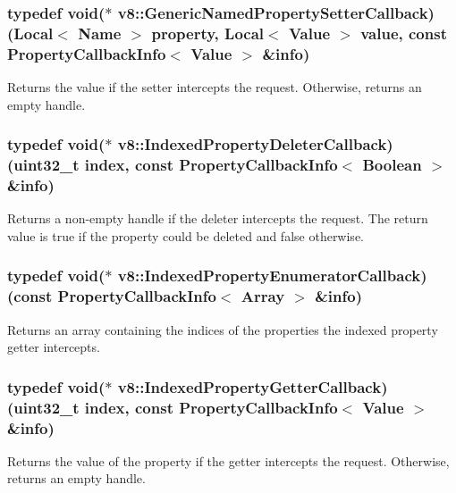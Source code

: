 \subsubsection[{Generic\+Named\+Property\+Setter\+Callback}]{\setlength{\rightskip}{0pt plus 5cm}typedef void($\ast$ v8\+::\+Generic\+Named\+Property\+Setter\+Callback) ({\bf Local}$<$ {\bf Name} $>$ property, {\bf Local}$<$ {\bf Value} $>$ value, const {\bf Property\+Callback\+Info}$<$ {\bf Value} $>$ \&info)}\label{namespacev8_af74716c6e95a269c6cd4314662fd0a7e}
Returns the value if the setter intercepts the request. Otherwise, returns an empty handle. \hypertarget{namespacev8_a53863728de14cde48dd6543207b2f2da}{}
\subsubsection[{Indexed\+Property\+Deleter\+Callback}]{\setlength{\rightskip}{0pt plus 5cm}typedef void($\ast$ v8\+::\+Indexed\+Property\+Deleter\+Callback) (uint32\+\_\+t index, const {\bf Property\+Callback\+Info}$<$ {\bf Boolean} $>$ \&info)}\label{namespacev8_a53863728de14cde48dd6543207b2f2da}
Returns a non-\/empty handle if the deleter intercepts the request. The return value is true if the property could be deleted and false otherwise. \hypertarget{namespacev8_adbb0a6d5537371953f9ba807d4f6275e}{}
\subsubsection[{Indexed\+Property\+Enumerator\+Callback}]{\setlength{\rightskip}{0pt plus 5cm}typedef void($\ast$ v8\+::\+Indexed\+Property\+Enumerator\+Callback) (const {\bf Property\+Callback\+Info}$<$ {\bf Array} $>$ \&info)}\label{namespacev8_adbb0a6d5537371953f9ba807d4f6275e}
Returns an array containing the indices of the properties the indexed property getter intercepts. \hypertarget{namespacev8_a48e7816ba64447bf32a25d194588daaf}{}
\subsubsection[{Indexed\+Property\+Getter\+Callback}]{\setlength{\rightskip}{0pt plus 5cm}typedef void($\ast$ v8\+::\+Indexed\+Property\+Getter\+Callback) (uint32\+\_\+t index, const {\bf Property\+Callback\+Info}$<$ {\bf Value} $>$ \&info)}\label{namespacev8_a48e7816ba64447bf32a25d194588daaf}
Returns the value of the property if the getter intercepts the request. Otherwise, returns an empty handle. \hypertarget{namespacev8_a980b62c33eb664783e61e25c3b27f9ee}{}
